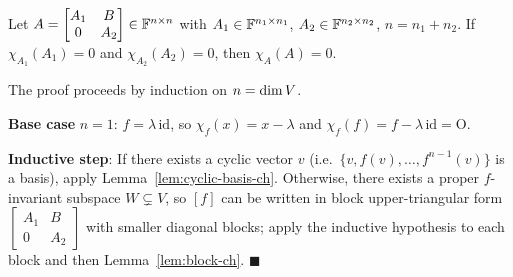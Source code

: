 \begin{thmbox}
\label{lem:block-ch}
Let $A=\begin{bmatrix}A_1&B\\0&A_2\end{bmatrix}\in\mathbb{F}^{n\times n}$ with
$A_1\in\mathbb{F}^{n_1\times n_1}$, $A_2\in\mathbb{F}^{n_2\times n_2}$, $n=n_1+n_2$.
If $\chi_{A_1}(A_1)=0$ and $\chi_{A_2}(A_2)=0$, then $\chi_A(A)=0$.
\end{thmbox}

\begin{proofbox}
The proof proceeds by induction on $n=\operatorname{dim} V$.

\textbf{Base case} $n=1$: $f=\lambda\,\mathrm{id}$, so $\chi_f(x)=x-\lambda$
and $\chi_f(f)=f-\lambda\,\mathrm{id}=\mathrm{O}$. \checkmark

\textbf{Inductive step}: If there exists a cyclic vector $v$ (i.e.\
$\{v,f(v),\ldots,f^{n-1}(v)\}$ is a basis), apply Lemma~\ref{lem:cyclic-basis-ch}.
Otherwise, there exists a proper $f$-invariant subspace $W\subsetneq V$, so
$[f]$ can be written in block upper-triangular form
$\begin{bmatrix}A_1&B\\0&A_2\end{bmatrix}$ with smaller diagonal blocks; apply
the inductive hypothesis to each block and then Lemma~\ref{lem:block-ch}.
\hfill$\blacksquare$
\end{proofbox}
